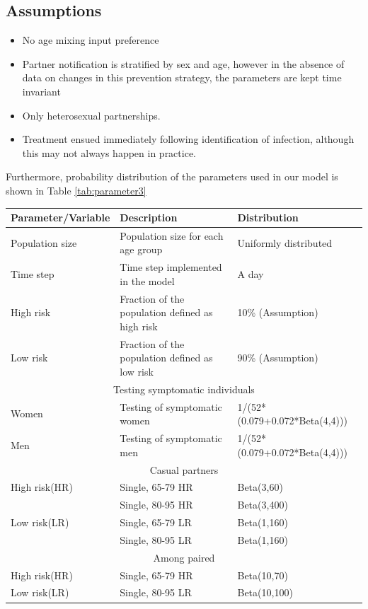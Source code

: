 \documentclass{article}
\begin{document}
\begin{normalsize}
\subsection{Assumptions}
\begin{itemize}
	\item No age mixing input preference
	\item Partner notification is stratified by sex and age, however in the absence of data on changes in this prevention strategy, the parameters are kept time invariant
	\item Only heterosexual partnerships.
	\item Treatment ensued immediately following identification of infection, although this may not always happen in practice.
\end{itemize}
Furthermore, probability distribution of the parameters used in our model is shown in Table \ref{tab:parameter3}\\
	\begin{table}[H]
	\centering
	\begin{tabular}{ |p{5cm}|p{7cm}|p{5cm}| } 
		\hline
		Parameter/Variable & Description & Distribution  \\ 
		\hline
		Population size & Population size for each age group & Uniformly distributed\\
		Time step &	Time step implemented in the model & 	A day \\
		High risk & Fraction of the population defined as high risk	& 10\% (Assumption) \\
		Low risk & Fraction of the population defined as low risk & 90\% (Assumption)\\
		\hline
		\multicolumn{3}{|c|}{Testing symptomatic individuals} \\
		\hline
		Women &	Testing of symptomatic  women	& 1/(52*(0.079+0.072*Beta(4,4)))\\
		Men	& Testing of symptomatic men	& 1/(52*(0.079+0.072*Beta(4,4)))\\
		\hline
		
		\multicolumn{3}{|c|}{Casual partners} \\
		\hline
		High risk(HR)& Single, 65-79 HR	& Beta(3,60)\\
		& Single, 80-95 HR	& Beta(3,400)\\
		Low risk(LR)	 & Single, 65-79 LR	& Beta(1,160) \\
		& Single, 80-95 LR	&Beta(1,160)\\
		\hline
		\multicolumn{3}{|c|}{Among paired} \\
		\hline
		High risk(HR)& Single, 65-79 HR	& Beta(10,70)\\
		Low risk(LR) & Single, 80-95 LR	& Beta(10,100)\\
		\hline
		

\end{tabular}
\end{table}
\end{normalsize}
\end{document}
